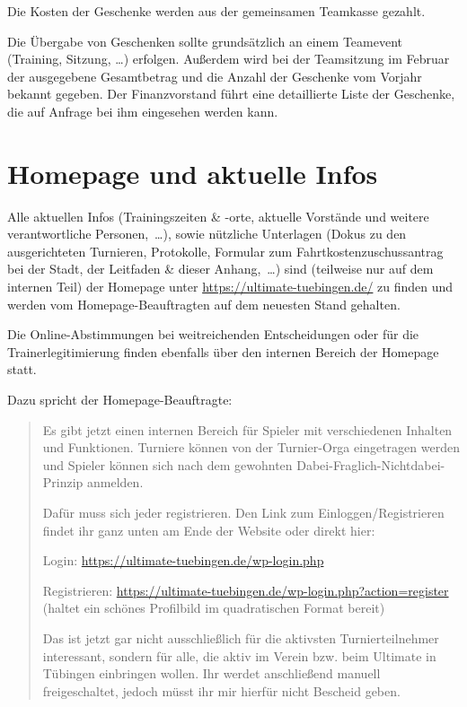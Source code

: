 \documentclass[a4 paper, 11pt]{article}
\begin{document}
Die Kosten der Geschenke werden aus der gemeinsamen Teamkasse gezahlt.

Die Übergabe von Geschenken sollte grundsätzlich an einem Teamevent (Training, Sitzung, …) erfolgen. Außerdem wird bei der Teamsitzung im Februar der ausgegebene Gesamtbetrag und die Anzahl der Geschenke vom Vorjahr bekannt gegeben. Der Finanzvorstand führt eine detaillierte Liste der Geschenke, die auf Anfrage bei ihm eingesehen werden kann.

\section{Homepage und aktuelle Infos}
Alle aktuellen Infos (Trainingszeiten \& -orte, aktuelle Vorstände und weitere verantwortliche Personen,~\dots), sowie nützliche Unterlagen (Dokus zu den ausgerichteten Turnieren, Protokolle, Formular zum Fahrtkostenzuschussantrag bei der Stadt, der Leitfaden \& dieser Anhang,~\dots) sind (teilweise nur auf dem internen Teil) der Homepage unter \url{https://ultimate-tuebingen.de/} zu finden und werden vom Homepage-Beauftragten auf dem neuesten Stand gehalten. 

Die Online-Abstimmungen bei weitreichenden Entscheidungen oder  für die Trainerlegitimierung finden ebenfalls über den internen Bereich der Homepage statt.

Dazu spricht der Homepage-Beauftragte:
\begin{quote}
Es gibt jetzt einen internen Bereich
für Spieler mit verschiedenen Inhalten und Funktionen. Turniere können
von der Turnier-Orga eingetragen werden und Spieler können sich nach dem
gewohnten Dabei-Fraglich-Nichtdabei-Prinzip anmelden.

Dafür muss sich jeder registrieren. Den Link zum Einloggen/Registrieren
findet ihr ganz unten am Ende der Website oder direkt hier:

Login: \url{https://ultimate-tuebingen.de/wp-login.php}

Registrieren: \url{https://ultimate-tuebingen.de/wp-login.php?action=register}
(haltet ein schönes Profilbild im quadratischen Format bereit)

Das ist jetzt gar nicht ausschließlich für die aktivsten
Turnierteilnehmer interessant, sondern für alle, die aktiv im Verein
bzw. beim Ultimate in Tübingen einbringen wollen. Ihr werdet anschließend
manuell freigeschaltet, jedoch müsst ihr mir hierfür nicht Bescheid geben.
\end{quote}
\end{document}
